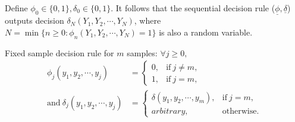 \documentclass[a4paper,english,12pt]{article}
\newcommand{\uphi}{\underline{\phi}}
\newcommand{\udel}{\underline{\delta}}
\begin{document}
\par Define $\phi_0\in\{0,1\},\delta_0\in\{0,1\}$. It follows that the sequential decision rule ($\uphi,\udel$) outputs decision $\delta_N(Y_1,Y_2,\cdots,Y_N)$, where $N=\min\{n\geq0 : \phi_n(Y_1,Y_2,\cdots,Y_N)=1\}$ is also a random variable.
\begin{exmp}
Fixed sample decision rule for $m$ samples: $\forall j\geq0,$
\begin{align}
\phi_j(y_1,y_2,\cdots,y_j)&= \begin{cases}
0, & \text{if}\  j\neq m,\\ 1, & \text{if}\  j=m, \end{cases}\\ \text{and}\ \delta_j(y_1,y_2,\cdots,y_j)&= \begin{cases} \delta(y_1,y_2,\cdots,y_m), & \text{if}\  j= m,\\arbitrary, &  \text{otherwise.}\end{cases}
\end{align}
\end{exmp}
\end{document}
